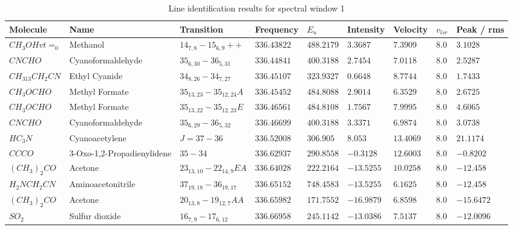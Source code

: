 \documentclass{aa}
\begin{document}
\begin{table}   
 \label{table:2}  
    \caption{Line identification results for spectral window 1}
    \tiny
    \centering    
    \begin{tabular}{l l l l l l l l l} 
    \hline     
    Molecule & Name &Transition & Frequency & $E_{u}$ & Intensity & Velocity & $v_{lsr}$ & Peak / rms\\ 
    \hline
$CH_{3}OHvt=_{0}$ & Methanol & $14_{7,8}-15_{6,9}++$ & $336.43822$ & $488.2179$ & $3.3687$ & $7.3909$ & $8.0$ & $3.1028$\\
$CNCHO$ & Cyanoformaldehyde & $35_{6,30}-36_{5,31}$ & $336.44841$ & $400.3188$ & $2.7454$ & $7.0118$ & $8.0$ & $2.5287$\\
$CH_{313}CH_{2}CN$ & Ethyl Cyanide & $34_{8,26}-34_{7,27}$ & $336.45107$ & $323.9327$ & $0.6648$ & $8.7744$ & $8.0$ & $1.7433$\\
$CH_{3}OCHO$ & Methyl Formate & $35_{13,23}-35_{12,24}A$ & $336.45452$ & $484.8088$ & $2.9014$ & $6.3529$ & $8.0$ & $2.6725$\\
$CH_{3}OCHO$ & Methyl Formate & $35_{13,22}-35_{12,23}E$ & $336.46561$ & $484.8108$ & $1.7567$ & $7.9995$ & $8.0$ & $4.6065$\\
$CNCHO$ & Cyanoformaldehyde & $35_{6,29}-36_{5,32}$ & $336.46699$ & $400.3188$ & $3.3371$ & $6.9874$ & $8.0$ & $3.0738$\\
$HC_{3}N$ & Cyanoacetylene & $J=37-36$ & $336.52008$ & $306.905$ & $8.053$ & $13.4069$ & $8.0$ & $21.1174$\\
$CCCO$ & 3-Oxo-1,2-Propadienylidene & $35-34$ & $336.62937$ & $290.8558$ & $-0.3128$ & $12.6003$ & $8.0$ & $-0.8202$\\
$(CH_{3})_{2}CO$ & Acetone & $23_{13,10}-22_{14,9}EA$ & $336.64028$ & $222.2164$ & $-13.5255$ & $10.0258$ & $8.0$ & $-12.458$\\
$H_{2}NCH_{2}CN$ & Aminoacetonitrile & $37_{19,18}-36_{19,17}$ & $336.65152$ & $748.4583$ & $-13.5255$ & $6.1625$ & $8.0$ & $-12.458$\\
$(CH_{3})_{2}CO$ & Acetone & $20_{13,8}-19_{12,7}AA$ & $336.65982$ & $171.7552$ & $-16.9879$ & $6.8598$ & $8.0$ & $-15.6472$\\
$SO_{2}$ & Sulfur dioxide & $16_{7,9}-17_{6,12}$ & $336.66958$ & $245.1142$ & $-13.0386$ & $7.5137$ & $8.0$ & $-12.0096$\\
    \hline                  
    \end{tabular}
\end{table}
\end{document}
